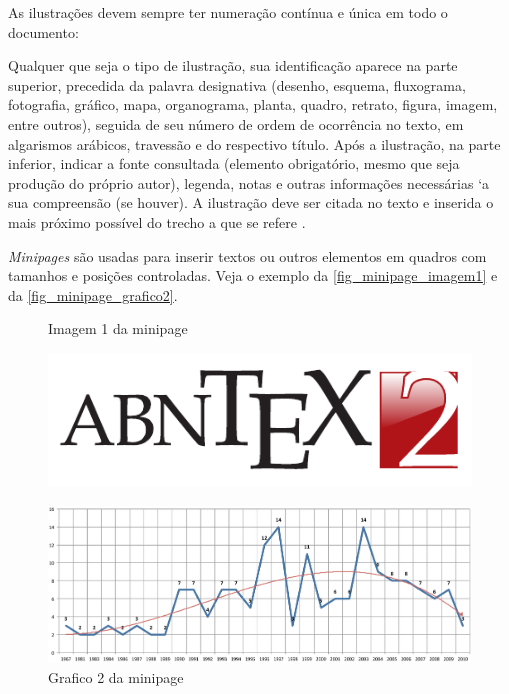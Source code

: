 As ilustrações devem sempre ter numeração contínua e única em todo o documento:


\begin{citacao}
	Qualquer que seja o tipo de ilustração, sua identificação aparece na parte
	superior, precedida da palavra designativa (desenho, esquema, fluxograma,
	fotografia, gr\'afico, mapa, organograma, planta, quadro, retrato, figura,
	imagem, entre outros), seguida de seu número de ordem de ocorr\^encia no texto,
	em algarismos ar\'abicos, travessão e do respectivo título. Após a ilustração, na
	parte inferior, indicar a fonte consultada (elemento obrigatório, mesmo que
	seja produção do próprio autor), legenda, notas e outras informações
	necess\'arias `a sua compreensão (se houver). A ilustração deve ser citada no
	texto e inserida o mais próximo possível do trecho a que se
	refere \cite{nbr14724}.
\end{citacao}

\emph{Minipages} são usadas para inserir textos ou outros elementos em quadros
com tamanhos e posições controladas. Veja o exemplo da
\autoref{fig_minipage_imagem1} e da \autoref{fig_minipage_grafico2}.

\begin{figure}[H]
	\label{teste}
	\centering
	\begin{minipage}{0.4\textwidth}
		\centering
		\caption{Imagem 1 da minipage} \label{fig_minipage_imagem1}
		\includegraphics[scale=0.9]{USPSC-img/USPSC-modelo-img-marca.pdf}
	\end{minipage}
	\hfill
	\begin{minipage}{0.4\textwidth}
		\centering
		\caption{Grafico 2 da minipage} \label{fig_minipage_grafico2}
		\includegraphics[scale=0.2]{USPSC-img/USPSC-modelo-img-grafico.pdf}
	\end{minipage}
\end{figure}


